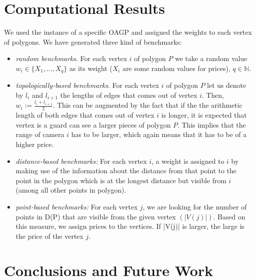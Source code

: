 \documentclass[runningheads,a4paper]{elsarticle}
\begin{document}
     \section{Computational Results}
       We used the instance of a specific OAGP and assigned the weights to each vertex of polygons. We have generated three kind of benchmarks:
       \begin{itemize}
       	  \item \emph{random benchmarks}. For each vertex $i$ of polygon $P$ we take a random value $w_i \in \{X_1,...,X_q\}$  as its weight ($X_i$ are some random values for prices), $q \in \mathbb{N}$.
       	  \item \emph{topologically-based benchmarks}. For each vertex $i$ of polygon $P$ let us denote by $l_i$ and $l_{i+1}$ the lengths of edges that comes out of vertex $i$. Then, $w_i := \frac{l_i + l_{i+1}}{2}$. This can be augmented by the fact that if the the arithmetic length of both edges that comes out of vertex $i$ is longer, it is expected that vertex is a guard can see a larger pieces of polygon $P$. This implies that the range of camera $i$ has to be larger, which again means that it has to be of a higher price.
       	 \item \emph{distance-based benchmarks:} For each vertex $i$, a weight is assigned to $i$ by making use of the information about the distance from that point to the point in the polygon which is at the longest distance but visible from $i$ (among all other points in polygon).
       	 \item \emph{point-based benchmarks:} For each vertex $j$, we are looking for the number of points in D(P) that are visible from the given vertex $(|V(j)|)$. Based on this measure, we assign prices to the vertices. If |V(j)| is larger, the large is the price of the vertex $j$.
       \end{itemize}
     \section{Conclusions and Future Work}



    
    
\end{document}
